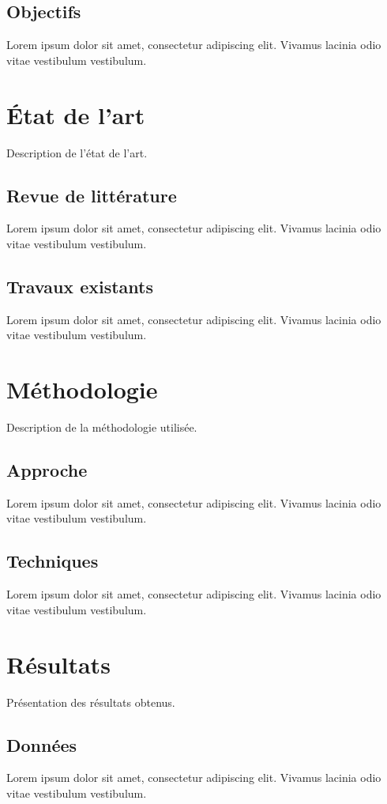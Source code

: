 \documentclass[a4paper, 12pt]{article}
\begin{document}
\subsection{Objectifs}
Lorem ipsum dolor sit amet, consectetur adipiscing elit. Vivamus lacinia odio vitae vestibulum vestibulum.

\newpage
\section{État de l'art}
Description de l'état de l'art.

\subsection{Revue de littérature}
Lorem ipsum dolor sit amet, consectetur adipiscing elit. Vivamus lacinia odio vitae vestibulum vestibulum.

\subsection{Travaux existants}
Lorem ipsum dolor sit amet, consectetur adipiscing elit. Vivamus lacinia odio vitae vestibulum vestibulum.

\newpage
\section{Méthodologie}
Description de la méthodologie utilisée.

\subsection{Approche}
Lorem ipsum dolor sit amet, consectetur adipiscing elit. Vivamus lacinia odio vitae vestibulum vestibulum.

\subsection{Techniques}
Lorem ipsum dolor sit amet, consectetur adipiscing elit. Vivamus lacinia odio vitae vestibulum vestibulum.

\newpage
\section{Résultats}
Présentation des résultats obtenus.

\subsection{Données}
Lorem ipsum dolor sit amet, consectetur adipiscing elit. Vivamus lacinia odio vitae vestibulum vestibulum.
\end{document}
